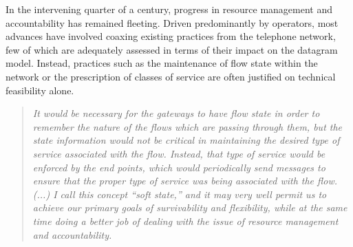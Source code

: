 In the intervening quarter of a century, progress in resource management and accountability has remained fleeting.
Driven predominantly by operators, most advances have involved coaxing existing practices from the telephone network, few of which are adequately assessed in terms of their impact on the datagram model.
Instead, practices such as the maintenance of flow state within the network or the prescription of classes of service are often justified on technical feasibility alone.
\LOREM
\LOREM

\begin{quote}
\textit{
It would be necessary for the gateways to have flow state in order to remember the nature of the flows which are passing through them, but the state information would not be critical in maintaining the desired type of service associated with the flow. Instead, that type of service would be enforced by the end points, which would periodically send messages to ensure that the proper type of service was being associated with the flow.
(...)
I call this concept ``soft state,'' and it may very well permit us to achieve our primary goals of survivability and flexibility, while at the same time doing a better job of dealing with the issue of resource management and accountability.
}
\end{quote}


